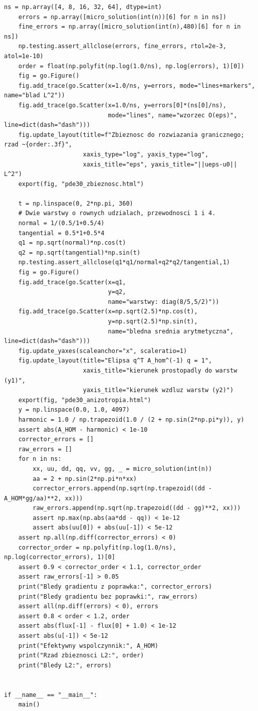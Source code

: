 \begin{lstlisting}[style=pythonpde,caption={Homogenizacja okresowa i macierz efektywna (Plotly)},label={code:pde30-plotly}]
    ns = np.array([4, 8, 16, 32, 64], dtype=int)
    errors = np.array([micro_solution(int(n))[6] for n in ns])
    fine_errors = np.array([micro_solution(int(n),480)[6] for n in ns])
    np.testing.assert_allclose(errors, fine_errors, rtol=2e-3, atol=1e-10)
    order = float(np.polyfit(np.log(1.0/ns), np.log(errors), 1)[0])
    fig = go.Figure()
    fig.add_trace(go.Scatter(x=1.0/ns, y=errors, mode="lines+markers", name="blad L^2"))
    fig.add_trace(go.Scatter(x=1.0/ns, y=errors[0]*(ns[0]/ns),
                             mode="lines", name="wzorzec O(eps)", line=dict(dash="dash")))
    fig.update_layout(title=f"Zbieznosc do rozwiazania granicznego; rzad ~{order:.3f}",
                      xaxis_type="log", yaxis_type="log",
                      xaxis_title="eps", yaxis_title="||ueps-u0|| L^2")
    export(fig, "pde30_zbieznosc.html")

    t = np.linspace(0, 2*np.pi, 360)
    # Dwie warstwy o rownych udzialach, przewodnosci 1 i 4.
    normal = 1/(0.5/1+0.5/4)
    tangential = 0.5*1+0.5*4
    q1 = np.sqrt(normal)*np.cos(t)
    q2 = np.sqrt(tangential)*np.sin(t)
    np.testing.assert_allclose(q1*q1/normal+q2*q2/tangential,1)
    fig = go.Figure()
    fig.add_trace(go.Scatter(x=q1,
                             y=q2,
                             name="warstwy: diag(8/5,5/2)"))
    fig.add_trace(go.Scatter(x=np.sqrt(2.5)*np.cos(t),
                             y=np.sqrt(2.5)*np.sin(t),
                             name="bledna srednia arytmetyczna", line=dict(dash="dash")))
    fig.update_yaxes(scaleanchor="x", scaleratio=1)
    fig.update_layout(title="Elipsa q^T A_hom^(-1) q = 1",
                      xaxis_title="kierunek prostopadly do warstw (y1)",
                      yaxis_title="kierunek wzdluz warstw (y2)")
    export(fig, "pde30_anizotropia.html")
    y = np.linspace(0.0, 1.0, 4097)
    harmonic = 1.0 / np.trapezoid(1.0 / (2 + np.sin(2*np.pi*y)), y)
    assert abs(A_HOM - harmonic) < 1e-10
    corrector_errors = []
    raw_errors = []
    for n in ns:
        xx, uu, dd, qq, vv, gg, _ = micro_solution(int(n))
        aa = 2 + np.sin(2*np.pi*n*xx)
        corrector_errors.append(np.sqrt(np.trapezoid((dd - A_HOM*gg/aa)**2, xx)))
        raw_errors.append(np.sqrt(np.trapezoid((dd - gg)**2, xx)))
        assert np.max(np.abs(aa*dd - qq)) < 1e-12
        assert abs(uu[0]) + abs(uu[-1]) < 5e-12
    assert np.all(np.diff(corrector_errors) < 0)
    corrector_order = np.polyfit(np.log(1.0/ns), np.log(corrector_errors), 1)[0]
    assert 0.9 < corrector_order < 1.1, corrector_order
    assert raw_errors[-1] > 0.05
    print("Bledy gradientu z poprawka:", corrector_errors)
    print("Bledy gradientu bez poprawki:", raw_errors)
    assert all(np.diff(errors) < 0), errors
    assert 0.8 < order < 1.2, order
    assert abs(flux[-1] - flux[0] + 1.0) < 1e-12
    assert abs(u[-1]) < 5e-12
    print("Efektywny wspolczynnik:", A_HOM)
    print("Rzad zbieznosci L2:", order)
    print("Bledy L2:", errors)


if __name__ == "__main__":
    main()
\end{lstlisting}

